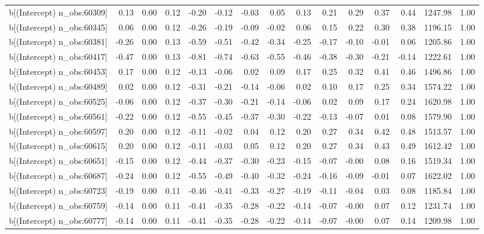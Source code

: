 \begin{table}[ht]
\begin{tabular}{rrrrrrrrrrrrrrr}
  b[(Intercept) n\_obs:60309] & 0.13 & 0.00 & 0.12 & -0.20 & -0.12 & -0.03 & 0.05 & 0.13 & 0.21 & 0.29 & 0.37 & 0.44 & 1247.98 & 1.00 \\ 
  b[(Intercept) n\_obs:60345] & 0.06 & 0.00 & 0.12 & -0.26 & -0.19 & -0.09 & -0.02 & 0.06 & 0.15 & 0.22 & 0.30 & 0.38 & 1196.15 & 1.00 \\ 
  b[(Intercept) n\_obs:60381] & -0.26 & 0.00 & 0.13 & -0.59 & -0.51 & -0.42 & -0.34 & -0.25 & -0.17 & -0.10 & -0.01 & 0.06 & 1205.86 & 1.00 \\ 
  b[(Intercept) n\_obs:60417] & -0.47 & 0.00 & 0.13 & -0.81 & -0.74 & -0.63 & -0.55 & -0.46 & -0.38 & -0.30 & -0.21 & -0.14 & 1222.61 & 1.00 \\ 
  b[(Intercept) n\_obs:60453] & 0.17 & 0.00 & 0.12 & -0.13 & -0.06 & 0.02 & 0.09 & 0.17 & 0.25 & 0.32 & 0.41 & 0.46 & 1496.86 & 1.00 \\ 
  b[(Intercept) n\_obs:60489] & 0.02 & 0.00 & 0.12 & -0.31 & -0.21 & -0.14 & -0.06 & 0.02 & 0.10 & 0.17 & 0.25 & 0.34 & 1574.22 & 1.00 \\ 
  b[(Intercept) n\_obs:60525] & -0.06 & 0.00 & 0.12 & -0.37 & -0.30 & -0.21 & -0.14 & -0.06 & 0.02 & 0.09 & 0.17 & 0.24 & 1620.98 & 1.00 \\ 
  b[(Intercept) n\_obs:60561] & -0.22 & 0.00 & 0.12 & -0.55 & -0.45 & -0.37 & -0.30 & -0.22 & -0.13 & -0.07 & 0.01 & 0.08 & 1579.90 & 1.00 \\ 
  b[(Intercept) n\_obs:60597] & 0.20 & 0.00 & 0.12 & -0.11 & -0.02 & 0.04 & 0.12 & 0.20 & 0.27 & 0.34 & 0.42 & 0.48 & 1513.57 & 1.00 \\ 
  b[(Intercept) n\_obs:60615] & 0.20 & 0.00 & 0.12 & -0.11 & -0.03 & 0.05 & 0.12 & 0.20 & 0.27 & 0.34 & 0.43 & 0.49 & 1612.42 & 1.00 \\ 
  b[(Intercept) n\_obs:60651] & -0.15 & 0.00 & 0.12 & -0.44 & -0.37 & -0.30 & -0.23 & -0.15 & -0.07 & -0.00 & 0.08 & 0.16 & 1519.34 & 1.00 \\ 
  b[(Intercept) n\_obs:60687] & -0.24 & 0.00 & 0.12 & -0.55 & -0.49 & -0.40 & -0.32 & -0.24 & -0.16 & -0.09 & -0.01 & 0.07 & 1622.02 & 1.00 \\ 
  b[(Intercept) n\_obs:60723] & -0.19 & 0.00 & 0.11 & -0.46 & -0.41 & -0.33 & -0.27 & -0.19 & -0.11 & -0.04 & 0.03 & 0.08 & 1185.84 & 1.00 \\ 
  b[(Intercept) n\_obs:60759] & -0.14 & 0.00 & 0.11 & -0.41 & -0.35 & -0.28 & -0.22 & -0.14 & -0.07 & -0.00 & 0.07 & 0.12 & 1231.74 & 1.00 \\ 
  b[(Intercept) n\_obs:60777] & -0.14 & 0.00 & 0.11 & -0.41 & -0.35 & -0.28 & -0.22 & -0.14 & -0.07 & -0.00 & 0.07 & 0.14 & 1209.98 & 1.00 \\ 

\end{tabular}
\end{table}

